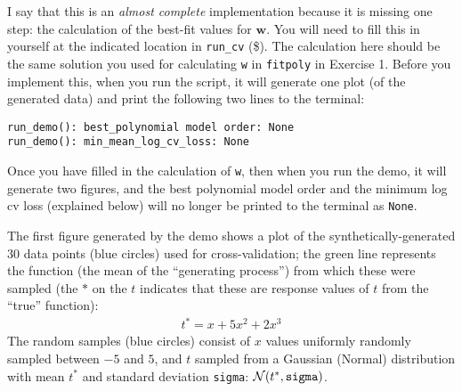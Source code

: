 \documentclass[10pt]{article}
\begin{document}
\begin{itemize}
I say that this is an {\em almost complete} implementation because it is missing one step: the calculation of the best-fit values for $\mathbf{w}$. You will need to fill this in yourself at the indicated location in {\tt run\_cv} (\$). The calculation here should be the same solution you used for calculating {\tt w} in {\tt fitpoly} in Exercise 1. Before you implement this, when you run the script, it will generate one plot (of the generated data) and print the following two lines to the terminal:
\begin{verbatim}
run_demo(): best_polynomial model order: None
run_demo(): min_mean_log_cv_loss: None
\end{verbatim}

Once you have filled in the calculation of {\tt w}, then when you run the demo, it will generate two figures, and the best polynomial model order and the minimum log cv loss (explained below) will no longer be printed to the terminal as {\tt None}.

The first figure generated by the demo shows a plot of the synthetically-generated $30$ data points (blue circles) used for cross-validation; the green line represents the function (the mean of the ``generating process'') from which these were sampled (the $*$ on the $t$ indicates that these are response values of $t$ from the ``true'' function):
\begin{eqnarray*}
t^* = x + 5x^2 + 2x^3
\end{eqnarray*}
The random samples (blue circles) consist of $x$ values uniformly randomly sampled between $-5$ and $5$, and $t$ sampled from a Gaussian (Normal) distribution with mean $t^*$ and standard deviation {\tt sigma}: $\mathcal{N}(t^*, \mathrm{\tt sigma})$.


\end{itemize}
\end{document}
